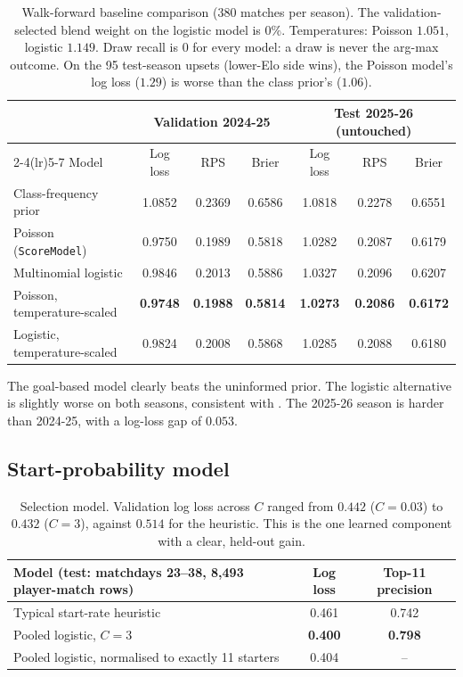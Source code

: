 \documentclass[11pt,a4paper]{article}
\newcommand{\code}[1]{\texttt{\small #1}}
\begin{document}
\begin{table}[h]
\centering\small
\begin{tabular}{@{}lcccccc@{}}
\toprule
& \multicolumn{3}{c}{Validation 2024-25} & \multicolumn{3}{c}{Test 2025-26 (untouched)} \\
\cmidrule(lr){2-4}\cmidrule(lr){5-7}
Model & Log loss & RPS & Brier & Log loss & RPS & Brier \\
\midrule
Class-frequency prior       & 1.0852 & 0.2369 & 0.6586 & 1.0818 & 0.2278 & 0.6551 \\
Poisson (\code{ScoreModel}) & 0.9750 & 0.1989 & 0.5818 & 1.0282 & 0.2087 & 0.6179 \\
Multinomial logistic        & 0.9846 & 0.2013 & 0.5886 & 1.0327 & 0.2096 & 0.6207 \\
Poisson, temperature-scaled & \textbf{0.9748} & \textbf{0.1988} & \textbf{0.5814} & \textbf{1.0273} & \textbf{0.2086} & \textbf{0.6172} \\
Logistic, temperature-scaled& 0.9824 & 0.2008 & 0.5868 & 1.0285 & 0.2088 & 0.6180 \\
\bottomrule
\end{tabular}
\caption{Walk-forward baseline comparison (380 matches per season). The
validation-selected blend weight on the logistic model is $0\%$. Temperatures:
Poisson $1.051$, logistic $1.149$. Draw recall is $0$ for every model: a draw
is never the arg-max outcome. On the 95 test-season upsets (lower-Elo side
wins), the Poisson model's log loss ($1.29$) is worse than the class prior's
($1.06$).}
\label{tab:baseline}
\end{table}

The goal-based model clearly beats the uninformed prior. The logistic
alternative is slightly worse on both seasons, consistent with
\citet{hubacek2019}. The 2025-26 season is harder than 2024-25, with a log-loss
gap of $0.053$.

\subsection{Start-probability model}

\begin{table}[h]
\centering\small
\begin{tabular}{@{}lcc@{}}
\toprule
Model (test: matchdays 23--38, 8{,}493 player-match rows) & Log loss & Top-11 precision\\
\midrule
Typical start-rate heuristic & 0.461 & 0.742\\
Pooled logistic, $C=3$ & \textbf{0.400} & \textbf{0.798}\\
Pooled logistic, normalised to exactly 11 starters & 0.404 & --\\
\bottomrule
\end{tabular}
\caption{Selection model. Validation log loss across $C$ ranged from $0.442$
($C=0.03$) to $0.432$ ($C=3$), against $0.514$ for the heuristic. This is the
one learned component with a clear, held-out gain.}
\label{tab:selection}
\end{table}
\end{document}
